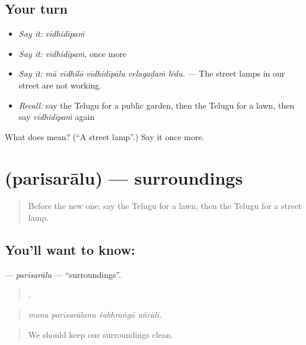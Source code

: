 \subsection*{Your turn}
\begin{itemize}
\raggedright
  \item \emph{Say it:} \emph{vīdhidīpaṁ}
  \item \emph{Say it:} \emph{vīdhidīpaṁ}, once more
  \item \emph{Say it:} \emph{mā vīdhilō vīdhidīpālu velagaḍaṁ lēdu.} — The street lamps in our street are not working.
  \item \emph{Recall:} say the Telugu for a public garden, then the Telugu for a lawn, then say \emph{vīdhidīpaṁ} again
\end{itemize}

\begin{tcolorbox}[breakable,colback=teal!4,colframe=teal!35!black,title={Before you move on}]
What does  mean? (\textquotedblleft{}A street lamp\textquotedblright{}.) Say it once more.
\end{tcolorbox}
\section[\texorpdfstring{\te{పరిసరాలు} (parisarālu)}{పరిసరాలు (parisarālu)}]{ (parisarālu) — surroundings}

\label{lesson:TE-C466-parisaralu}



\begin{quote}
Before the new one: say the Telugu for a lawn, then the Telugu for a street lamp.
\end{quote}

\subsection*{You'll want to know: }
\textbf{} — \emph{parisarālu} — \textquotedblleft{}surroundings\textquotedblright{}.

\begin{quote}
   .
\end{quote}

\begin{quote}
\emph{mana parisarālanu śubhraṅgā uñcāli.}
\end{quote}

\begin{quote}
We should keep our surroundings clean.
\end{quote}

